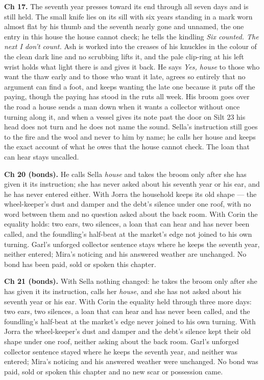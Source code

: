 \documentclass{design/chronicle}
\begin{document}
{\textbf{Ch 17.} The seventh year presses toward its end through all seven days and is still held. The small knife lies on its sill with six years standing in a mark worn almost flat by his thumb and the seventh nearly gone and unnamed, the one entry in this house the house cannot check; he tells the kindling \emph{Six counted. The next I don’t count.} Ash is worked into the creases of his knuckles in the colour of the clean dark line and no scrubbing lifts it, and the pale clip-ring at his left wrist holds what light there is and gives it back. He says \emph{Yes, house} to those who want the thaw early and to those who want it late, agrees so entirely that no argument can find a foot, and keeps wanting the late one because it puts off the paying, though the paying has stood in the ruts all week. His broom goes over the road a house sends a man down when it wants a collector without once turning along it, and when a vessel gives its note past the door on Silt 23 his head does not turn and he does not name the sound. Sella’s instruction still goes to the fire and the wool and never to him by name; he calls her house and keeps the exact account of what he owes that the house cannot check. The loan that can hear stays uncalled.

\textbf{Ch 20 (bonds).} He calls Sella \emph{house} and takes the broom only after she has given it its instruction; she has never asked about his seventh year or his ear, and he has never entered either. With Jorra the household keeps its old shape --- the wheel-keeper’s dust and damper and the debt’s silence under one roof, with no word between them and no question asked about the back room. With Corin the equality holds: two ears, two silences, a loan that can hear and has never been called, and the foundling’s half-beat at the market’s edge not joined to his own turning. Garl’s unforged collector sentence stays where he keeps the seventh year, neither entered; Mira’s noticing and his answered weather are unchanged. No bond has been paid, sold or spoken this chapter.

\textbf{Ch 21 (bonds).} With Sella nothing changed: he takes the broom only after she has given it its instruction, calls her \emph{house}, and she has not asked about his seventh year or his ear. With Corin the equality held through three more days: two ears, two silences, a loan that can hear and has never been called, and the foundling’s half-beat at the market’s edge never joined to his own turning. With Jorra the wheel-keeper’s dust and damper and the debt’s silence kept their old shape under one roof, neither asking about the back room. Garl’s unforged collector sentence stayed where he keeps the seventh year, and neither was entered; Mira’s noticing and his answered weather were unchanged. No bond was paid, sold or spoken this chapter and no new scar or possession came.

}
\end{document}

